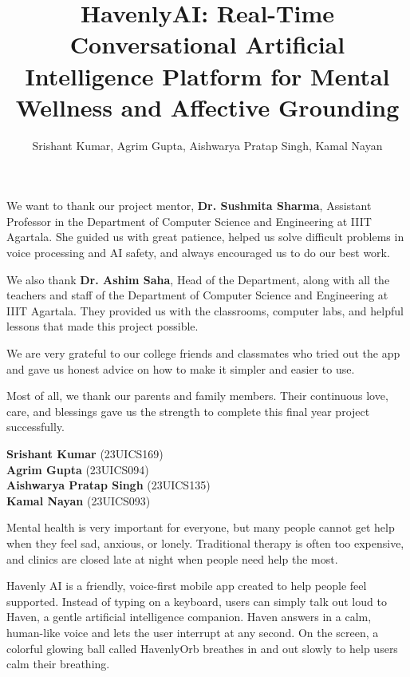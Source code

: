 \documentclass[USenglish,a4paper,12pt]{nitathesis}
\title{HavenlyAI: Real-Time Conversational Artificial Intelligence Platform for Mental Wellness and Affective Grounding}
\author{Srishant Kumar, Agrim Gupta, Aishwarya Pratap Singh, Kamal Nayan}
\begin{document}
\beforepreface


We want to thank our project mentor, \textbf{Dr. Sushmita Sharma}, Assistant Professor in the Department of Computer Science and Engineering at IIIT Agartala. She guided us with great patience, helped us solve difficult problems in voice processing and AI safety, and always encouraged us to do our best work.

We also thank \textbf{Dr. Ashim Saha}, Head of the Department, along with all the teachers and staff of the Department of Computer Science and Engineering at IIIT Agartala. They provided us with the classrooms, computer labs, and helpful lessons that made this project possible.

We are very grateful to our college friends and classmates who tried out the app and gave us honest advice on how to make it simpler and easier to use. 

Most of all, we thank our parents and family members. Their continuous love, care, and blessings gave us the strength to complete this final year project successfully.

\vspace*{1.0cm} 
\begin{flushright}
\textbf{Srishant Kumar} (23UICS169)\\
\textbf{Agrim Gupta} (23UICS094)\\
\textbf{Aishwarya Pratap Singh} (23UICS135)\\
\textbf{Kamal Nayan} (23UICS093)
\end{flushright}

\pagestyle{fancy}
\fancyhead[RO,RE]{\nouppercase\rightmark}
\fancyfoot[C]{\thepage}
\listoffigures
\listoftables
\newpage


Mental health is very important for everyone, but many people cannot get help when they feel sad, anxious, or lonely. Traditional therapy is often too expensive, and clinics are closed late at night when people need help the most. 

Havenly AI is a friendly, voice-first mobile app created to help people feel supported. Instead of typing on a keyboard, users can simply talk out loud to Haven, a gentle artificial intelligence companion. Haven answers in a calm, human-like voice and lets the user interrupt at any second. On the screen, a colorful glowing ball called HavenlyOrb breathes in and out slowly to help users calm their breathing. 
\end{document}
